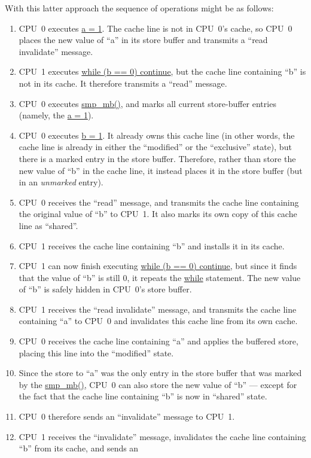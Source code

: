 With this latter approach the sequence of operations might be as follows:
\begin{enumerate}
\item	CPU~0 executes \url{a = 1}.  The cache line is not in
	CPU~0's cache, so CPU~0 places the new value of ``a'' in its
	store buffer and transmits a ``read invalidate'' message.
\item	CPU~1 executes \url{while (b == 0) continue}, but the cache line
	containing ``b'' is not in its cache.
	It therefore transmits a ``read'' message.
\item	CPU~0 executes \url{smp_mb()}, and marks all current store-buffer
	entries (namely, the \url{a = 1}).
\item	CPU~0 executes \url{b = 1}.
	It already owns this cache line (in other words, the cache line
	is already in either the ``modified'' or the ``exclusive'' state),
	but there is a marked entry in the store buffer.
	Therefore, rather than store the new value of ``b'' in the
	cache line, it instead places it in the store buffer (but
	in an \emph{unmarked} entry).
\item	CPU~0 receives the ``read'' message, and transmits the
	cache line containing the original value of ``b''
	to CPU~1.
	It also marks its own copy of this cache line as ``shared''.
\item	CPU~1 receives the cache line containing ``b'' and installs
	it in its cache.
\item	CPU~1 can now finish executing \url{while (b == 0) continue},
	but since it finds that the value of ``b'' is still 0, it repeats
	the \url{while} statement.
	The new value of ``b'' is safely hidden in CPU~0's store buffer.
\item	CPU~1 receives the ``read invalidate'' message, and
	transmits the cache line containing ``a'' to CPU~0 and
	invalidates this cache line from its own cache.
\item	CPU~0 receives the cache line containing ``a'' and applies
	the buffered store, placing this line into the ``modified''
	state.
\item	Since the store to ``a'' was the only
	entry in the store buffer that was marked by the \url{smp_mb()},
	CPU~0 can also store the new value of ``b'' --- except for the
	fact that the cache line containing ``b'' is now in ``shared''
	state.
\item	CPU~0 therefore sends an ``invalidate'' message to CPU~1.
\item	CPU~1 receives the ``invalidate'' message, invalidates the
	cache line containing ``b'' from its cache, and sends an

\end{enumerate}
